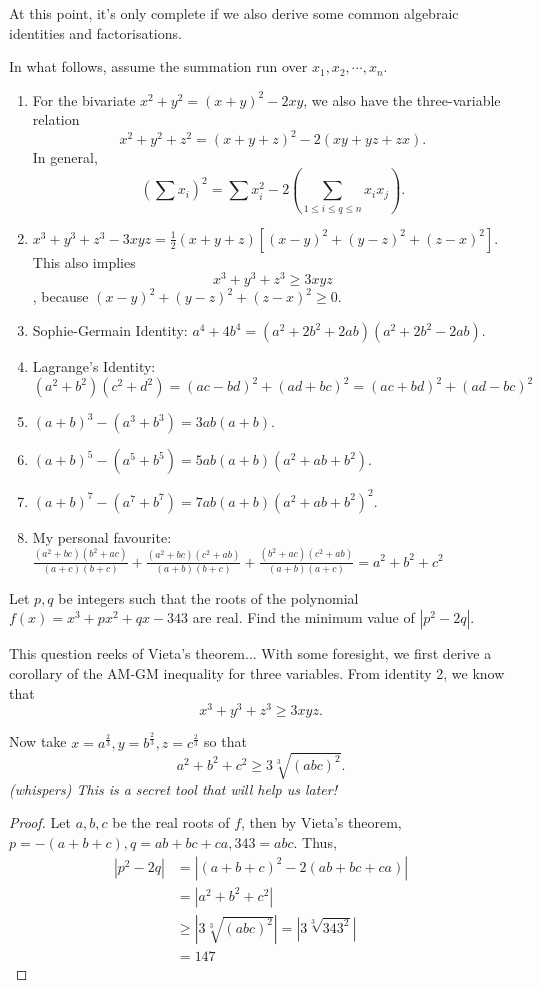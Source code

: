 \documentclass[../main.tex]{subfiles}
\begin{document}
At this point, it's only complete if we also derive some common algebraic identities and factorisations. 
\begin{proposition}[Classic]
    In what follows, assume the summation run over $x_1,x_2,\cdots,x_n$.
    \begin{enumerate}
        \item For the bivariate $x^2+y^2=(x+y)^2-2xy$, we also have the three-variable relation $$x^2+y^2+z^2=(x+y+z)^2-2(xy+yz+zx).$$
        In general, $$\left(\sum x_i\right)^2=\sum x_i^2-2\left(\sum_{1\leq i\leq q\leq n}x_ix_j\right).$$

        \item $x^3+y^3+z^3-3xyz=\frac{1}{2}(x+y+z)[(x-y)^2+(y-z)^2+(z-x)^2]$.
        This also implies $$x^3+y^3+z^3 \geq 3xyz$$, because
        $(x-y)^2+(y-z)^2+(z-x)^2\geq 0$.
        \item Sophie-Germain Identity: $a^4+4b^4=(a^2+2b^2+2ab)(a^2+2b^2-2ab)$.
        \item Lagrange's Identity: $(a^2+b^2)(c^2+d^2)=(ac-bd)^2+(ad+bc)^2=(ac+bd)^2+(ad-bc)^2$
        \item $(a+b)^3-(a^3+b^3)=3ab(a+b)$.
        \item $(a+b)^5-(a^5+b^5)=5ab(a+b)(a^2+ab+b^2)$.
        \item $(a+b)^7-(a^7+b^7)=7ab(a+b)(a^2+ab+b^2)^2$.
        \item My personal favourite: $\frac{(a^2+bc)(b^2+ac)}{(a+c)(b+c)}+\frac{(a^2+bc)(c^2+ab)}{(a+b)(b+c)}+\frac{(b^2+ac)(c^2+ab)}{(a+b)(a+c)}=a^2+b^2+c^2$
    \end{enumerate}
\end{proposition}
\begin{example}[2016 SMO(O) P15]
    Let $p,q$ be integers such that the roots of the polynomial $f(x)=x^3+px^2+qx-343$ are real. Find the minimum value of $|p^2-2q|$.
\end{example}
This question reeks of Vieta's theorem... With some foresight, we first derive a corollary of the AM-GM inequality for three variables. From identity 2, we know that
    $$x^3+y^3+z^3 \geq 3xyz.$$

    Now take $x=a^{\frac{2}{3}}, y=b^{\frac{2}{3}}, z=c^{\frac{2}{3}}$ so that
    $$a^2+b^2+c^2\geq 3\sqrt[3]{(abc)^2}.$$
    \textit{(whispers) This is a secret tool that will help us later!}
\begin{proof}
    
    Let $a,b,c$ be the real roots of $f$, then by Vieta's theorem, $p=-(a+b+c), q=ab+bc+ca, 343=abc$.
    Thus,
    \begin{align*}
        |p^2-2q|&=|(a+b+c)^2-2(ab+bc+ca)| \\
        &=|a^2+b^2+c^2| \\
        &\geq |3\sqrt[3]{(abc)^2}| = |3\sqrt[3]{343^2}| \\
        &=\boxed{147}
    \end{align*}
\end{proof}
\end{document}
